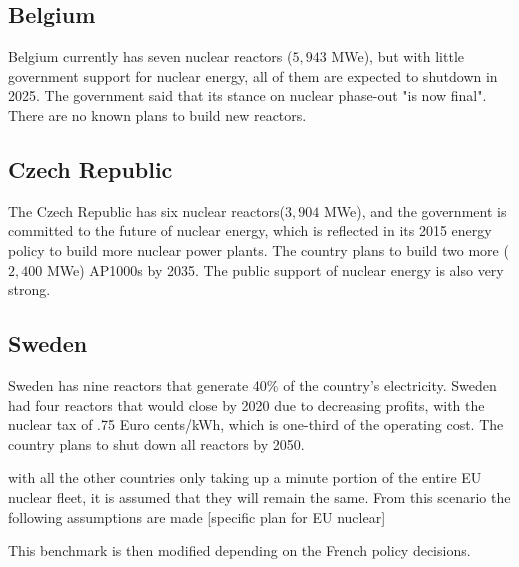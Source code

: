 \subsection{Belgium}
Belgium currently has seven nuclear reactors ($5,943$ MWe), but with little government support
for nuclear energy, all of them are expected to shutdown in 2025. The government
said that its stance on nuclear phase-out "is now final". There are no known plans
to build new reactors.

\subsection{Czech Republic}
The Czech Republic has six nuclear reactors($3,904$ MWe), and the government is committed to the
future of nuclear energy, which is reflected in its 2015 energy policy to build 
more nuclear power plants. The country plans to build two more ($2,400$ MWe) AP1000s by 2035.
The public support of nuclear energy is also very strong.

\subsection{Sweden}
Sweden has nine reactors that generate 40\% of the country's electricity. 
Sweden had four reactors that would close by 2020 due to decreasing profits,
with the nuclear tax of .75 Euro cents/kWh, which is one-third of the operating
cost. The country plans to shut down all reactors by 2050.


with all the other countries only taking up a minute portion of the entire
EU nuclear fleet, it is assumed that they will remain the same.
From this scenario the following assumptions are made
[specific plan for EU nuclear]

This benchmark is then modified depending on the French policy decisions.